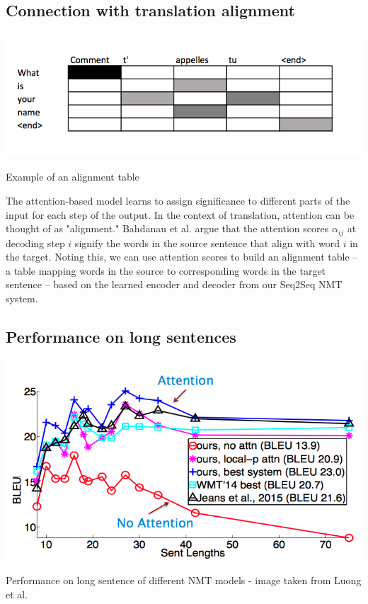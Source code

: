 \documentclass{tufte-handout}
\begin{document}

\subsection{Connection with translation alignment}

\begin{marginfigure}
	\centering
	\includegraphics[width=\linewidth]{alignment.png}
	\caption {Example of an alignment table}
	\label{fig:bidir_enc}
\end{marginfigure}

The attention-based model learns to assign significance to different parts of the input for each step of the output.
In the context of translation, attention can be thought of as "alignment." Bahdanau et al. argue that the attention scores $\alpha_{ij}$ at decoding step $i$ signify the words in the source sentence that align with word $i$ in the target. Noting this, we can use attention scores to build an alignment table -- a table mapping words in the source to corresponding words in the target sentence -- based on the learned encoder and decoder from our Seq2Seq NMT system.


\subsection{Performance on long sentences}

\begin{marginfigure}
	\centering
	\includegraphics[width=\linewidth]{longsentences.png}
	\caption {Performance on long sentence of different NMT models - image taken from Luong et al.}
	\label{fig:bidir_enc}
\end{marginfigure}
\end{document}
